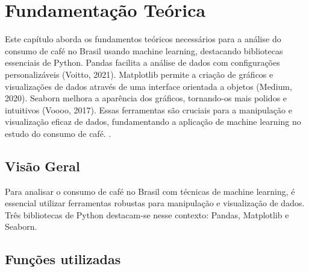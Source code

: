 \chapter{Fundamentação Teórica}
\label{ch:identificador}
	\begin{resumocapitulo}
		Este capítulo aborda os fundamentos teóricos necessários para a análise do consumo de café no Brasil usando machine learning, destacando bibliotecas essenciais de Python. Pandas facilita a análise de dados com configurações personalizáveis (Voitto, 2021). Matplotlib permite a criação de gráficos e visualizações de dados através de uma interface orientada a objetos (Medium, 2020). Seaborn melhora a aparência dos gráficos, tornando-os mais polidos e intuitivos (Voooo, 2017). Essas ferramentas são cruciais para a manipulação e visualização eficaz de dados, fundamentando a aplicação de machine learning no estudo do consumo de café.
.
	\end{resumocapitulo}
	\section{Visão Geral}
		Para analisar o consumo de café no Brasil com técnicas de machine learning, é essencial utilizar ferramentas robustas para manipulação e visualização de dados. Três bibliotecas de Python destacam-se nesse contexto: Pandas, Matplotlib e Seaborn.

	\section{Funções utilizadas}
	\label{sec:identificao}
      
